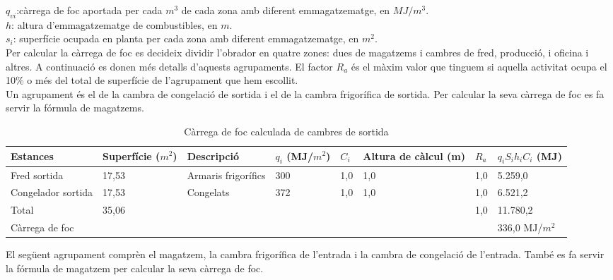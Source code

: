 $q_{vi}$:càrrega de foc aportada per cada $m^3$ de cada zona amb diferent emmagatzematge, en $MJ/m^3$.\\
$h$: altura d'emmagatzematge de combustibles, en $m$.\\
$s_i$: superfície ocupada en planta per cada zona amb diferent emmagatzematge, en $m^2$.\\
\newline Per calcular la càrrega de foc es decideix dividir l'obrador en quatre zones: dues de magatzems i cambres de fred, producció, i oficina i altres. A continuació es donen més detalls d'aquests agrupaments. El factor $R_a$ és el màxim valor que tinguem si aquella activitat ocupa el 10\% o més del total de superfície de l'agrupament que hem escollit.\\
\newline Un agrupament és el de la cambra de congelació de sortida i el de la cambra frigorífica de sortida. Per calcular la seva càrrega de foc es fa servir la fórmula de magatzems.
%
\begin{table}[H]
\footnotesize
\begin{center}
 \begin{tabu} to \textwidth {|X[1.5, l]|X[r]|X[2, l]|X[1, r]|X[0.5, r]|X[r]|X[0.5, r]|X[r]|}%
 \hline
Estances & Superfície ($m^2$)& Descripció & $q_i$ (MJ/$m^2$) & $C_i$ & Altura de càlcul (m) & $R_a$ & $q_{i}S_ih_iC_i$ (MJ) \\
 \hline \hline 
Fred sortida & 17,53 & Armaris frigorífics & 300 & 1,0 & 1,0 & 1,0 & 5.259,0 \\ \hline
Congelador sortida & 17,53 & Congelats & 372 & 1,0 & 1,0 & 1,0 & 6.521,2 \\ \hline
\hline
Total & 35,06 & & & & & 1,0 & 11.780,2 \\ \hline
Càrrega de foc &  & 336,0 MJ/$m^2$ \\ \hline
 \end{tabu}
 \caption{Càrrega de foc calculada de cambres de sortida}
\end{center}
\end{table}
\noindent El següent agrupament comprèn el magatzem, la cambra frigorífica de l'entrada i la cambra de congelació de l'entrada. També es fa servir la fórmula de magatzem per calcular la seva càrrega de foc.
%
